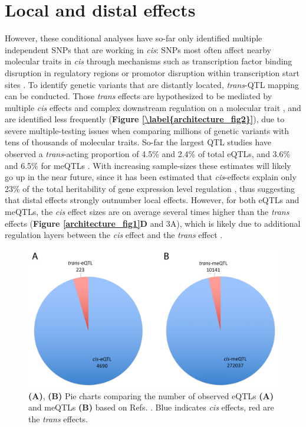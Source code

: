 \section{Local and distal effects}
However, these conditional analyses have so-far only identified multiple independent SNPs that are working in \emph{cis}: SNPs most often affect nearby molecular traits in \emph{cis} through mechanisms such as transcription factor binding disruption in regulatory regions or promotor disruption within transcription start sites \cite{brownIntegrativeModelingEQTLs2013}. To identify genetic variants that are distantly located, \emph{trans}-QTL mapping can be conducted. Those \emph{trans} effects are hypothesized to be mediated by multiple \emph{cis} effects and complex downstream regulation on a molecular trait \cite{westraSystematicIdentificationTrans2013,wongInterplayCisTrans2017}, and are identified less frequently (\textbf{Figure \ref{\label{architecture_fig2}}}), due to severe multiple-testing issues when comparing millions of genetic variants with tens of thousands of molecular traits. So-far the largest QTL studies have observed a \emph{trans}-acting proportion of 4.5\% \cite{westraSystematicIdentificationTrans2013} and 2.4\% \cite{wrightHeritabilityGenomicsGene2014} of total eQTLs, and 3.6\% \cite{bonderDiseaseVariantsAlter2017} and 6.5\% for meQTLs \cite{gauntSystematicIdentificationGenetic2016}. With increasing sample-sizes these estimates will likely go up in the near future, since it has been estimated that \emph{cis}-effects explain only 23\% of the total heritability of gene expression level regulation \cite{wrightHeritabilityGenomicsGene2014}, thus suggesting that distal effects strongly outnumber local effects. However, for both eQTLs and meQTLs, the \emph{cis} effect sizes are on average several times higher than the \emph{trans} effects (\textbf{Figure \ref{architecture_fig1}D} and 3A), which is likely due to additional regulation layers between the \emph{cis} effect and the \emph{trans} effect \cite{albertRoleRegulatoryVariation2015}. 

\begin{figure}[H]
	\includegraphics[width=\textwidth]{chapters/chapter2-genetic-architecture/img/Figure2.png}
	\caption{\textbf{(A)}, \textbf{(B)} Pie charts comparing the number of observed eQTLs \textbf{(A)} and meQTLs \textbf{(B)} based on Refs. \cite{zhernakovaIdentificationContextdependentExpression2017,wongInterplayCisTrans2017}. Blue indicates \emph{cis} effects, red are the \emph{trans} effects.}
	\label{architecture_fig2}
\end{figure}

